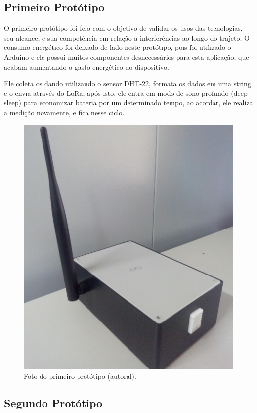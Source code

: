 \subsection{Primeiro Protótipo}
\label{metod:end-node:1-proto}
O primeiro protótipo foi feio com o objetivo de validar os usos das tecnologias, seu alcance, e sua competência em relação a interferências ao longo do trajeto. O consumo energético foi deixado de lado neste protótipo, pois foi utilizado o Arduino e ele possui muitos componentes desnecessários para esta aplicação, que acabam aumentando o gasto energético do dispositivo.

Ele coleta os dando utilizando o sensor DHT-22, formata os dados em uma string e o envia através do LoRa, após isto, ele entra em modo de sono profundo (deep sleep) para economizar bateria por um determinado tempo, ao acordar, ele realiza a medição novamente, e fica nesse ciclo.

\begin{figure}[H]
  \centering
  \includegraphics[width=.80\textwidth]{assets/end-node-proto-1.png} 
  \caption{Foto do primeiro protótipo (autoral).}
  \label{fig:end-node-proto-1} 
\end{figure}

\subsection{Segundo Protótipo}
\label{metod:end-node:2-proto}


